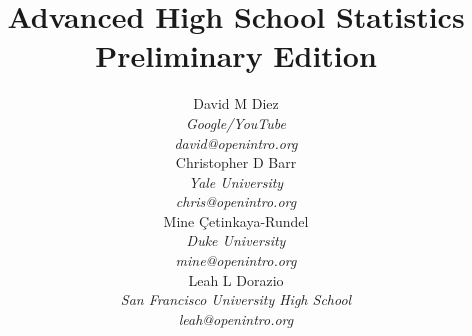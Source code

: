 
\title{\huge Advanced High School Statistics\vspace{1.5mm} \\ \Large Preliminary Edition}
\author{David M Diez \\
\small\emph{Google/YouTube} \\
\vspace{6mm}%
\small\emph{david@openintro.org} \\
Christopher D Barr \\
\small\emph{Yale University} \\
\vspace{6mm}%
\small\emph{chris@openintro.org} \\
Mine \c{C}etinkaya-Rundel \\
\small\emph{Duke University} \\
\vspace{6mm}%
\small\emph{mine@openintro.org} \\
Leah L Dorazio \\
\small\emph{San Francisco University High School} \\
\small\emph{leah@openintro.org}}
